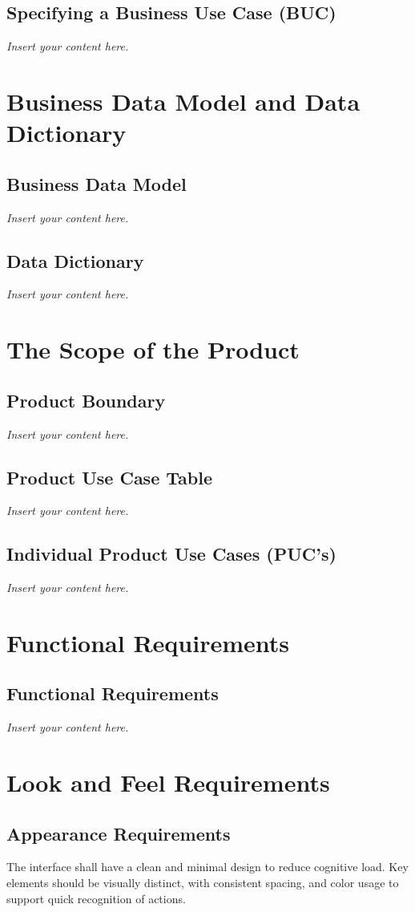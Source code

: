 \documentclass[12pt]{article}
\newcommand{\lips}{\textit{Insert your content here.}}
\begin{document}
\subsection{Specifying a Business Use Case (BUC)}
\lips

\section{Business Data Model and Data Dictionary}
\subsection{Business Data Model}
\lips
\subsection{Data Dictionary}
\lips

\section{The Scope of the Product}
\subsection{Product Boundary}
\lips
\subsection{Product Use Case Table}
\lips
\subsection{Individual Product Use Cases (PUC's)}
\lips

\section{Functional Requirements}
\subsection{Functional Requirements}
\lips

\section{Look and Feel Requirements}
\subsection{Appearance Requirements}
The interface shall have a clean and minimal design to reduce cognitive load. Key elements should be visually distinct, with consistent spacing, and color usage to support quick recognition of actions.
\end{document}
